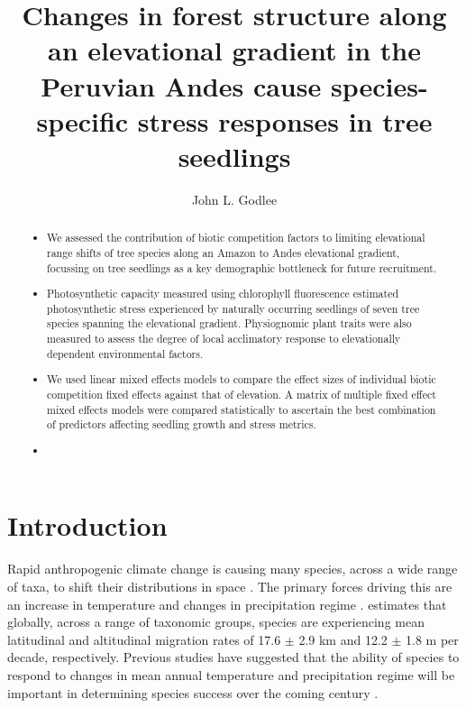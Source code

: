 \documentclass[a4paper, 11pt]{article}
\title{Changes in forest structure along an elevational gradient in the Peruvian Andes cause species-specific stress responses in tree seedlings}
\author{John L. Godlee}
\begin{document}

\maketitle{}

\begin{abstract}
\noindent

\begin{itemize}
\item{We assessed the contribution of biotic competition factors to limiting elevational range shifts of tree species along an Amazon to Andes elevational gradient, focussing on tree seedlings as a key demographic bottleneck for future recruitment.}
\item{Photosynthetic capacity measured using chlorophyll fluorescence estimated photosynthetic stress experienced by naturally occurring seedlings of seven tree species spanning the elevational gradient. Physiognomic plant traits were also measured to assess the degree of local acclimatory response to elevationally dependent environmental factors.}
\item{We used linear mixed effects models to compare the effect sizes of individual biotic competition fixed effects against that of elevation. A matrix of multiple fixed effect mixed effects models were compared statistically to ascertain the best combination of predictors affecting seedling growth and stress metrics.}
\item{}
\end{itemize}


\end{abstract}

\section{Introduction}
Rapid anthropogenic climate change is causing many species, across a wide range of taxa, to shift their distributions in space \citep{Chen2011, Hughes2000, Parmesan2006}. The primary forces driving this are an increase in temperature and changes in precipitation regime \citep{Corlett2013, McCain2011}. \citet{Chen2011} estimates that globally, across a range of taxonomic groups, species are experiencing mean latitudinal and altitudinal migration rates of 17.6 $\pm$ 2.9 km and 12.2 $\pm$ 1.8 m per decade, respectively. Previous studies have suggested that the ability of species to respond to changes in mean annual temperature and precipitation regime will be important in determining species success over the coming century \citep{Colwell2008, Chen2011, Feeley2012}. 
\end{document}
